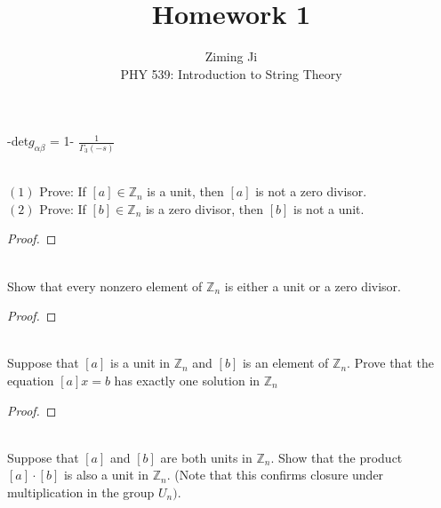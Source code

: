 \documentclass[12pt]{article}
\newcommand{\Z}{\mathbb{Z}}
\newenvironment{problem}[2][Problem]{\begin{trivlist}
\item[\hskip \labelsep {\bfseries #1}\hskip \labelsep {\bfseries #2.}]}{\end{trivlist}}
\begin{document}
 
\title{Homework 1}
\author{Ziming Ji\\ 
PHY 539: Introduction to String Theory}
 
\maketitle
 
\begin{problem}{1}

\end{problem}

 -det$g_{\alpha\beta}$ = 1-
$\frac{1}{\Gamma _3(-s)}$
 
\begin{problem}{2}
\text{ }\\
$(1)$ Prove: If $[a] \in \Z_{n}$ is a unit, then $[a]$ is not a zero divisor.\\
$(2)$ Prove: If $[b] \in \Z_{n}$ is a zero divisor, then $[b]$ is not a unit.
\end{problem}
 
\begin{proof}

\end{proof}

\begin{problem}{3}
\text{ }\\
Show that every nonzero element of $\Z_{n}$ is either a unit or a zero divisor.
\end{problem}
 
\begin{proof}

\end{proof}

\begin{problem}{4}
\text{ }\\
Suppose that $[a]$ is a unit in $\Z_{n}$ and $[b]$ is an element of $\Z_{n}$. Prove that the equation $[a]x = b$ has exactly one solution in $\Z_{n}$
\end{problem}
 
\begin{proof}

\end{proof}

\begin{problem}{5}
\text{ }\\
Suppose that $[a]$ and $[b]$ are both units in $\Z_{n}$.  Show that the product $[a] \cdot [b]$ is also a unit in $\Z_{n}.$ (Note that this confirms closure under multiplication in the group $U_{n})$.
\end{problem}
 
\end{document}
